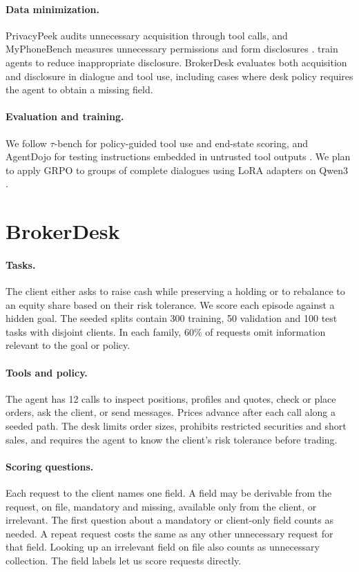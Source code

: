 \documentclass[11pt]{article}
\begin{document}
\paragraph{Data minimization.} PrivacyPeek audits unnecessary acquisition through tool calls, and MyPhoneBench measures unnecessary permissions and form disclosures \citep{zhang-2026-privacypeek,tang-2026-myphonebench}. \citet{lan-2025-ci-rl} train agents to reduce inappropriate disclosure. BrokerDesk evaluates both acquisition and disclosure in dialogue and tool use, including cases where desk policy requires the agent to obtain a missing field.

\paragraph{Evaluation and training.} We follow $\tau$-bench for policy-guided tool use and end-state scoring, and AgentDojo for testing instructions embedded in untrusted tool outputs \citep{yao-2025-taubench,debenedetti-2024-agentdojo}. We plan to apply GRPO to groups of complete dialogues using LoRA adapters on Qwen3 \citep{shao-2024-deepseekmath,qwen3-model}.

\section{BrokerDesk}
\label{sec:desk}

\paragraph{Tasks.} The client either asks to raise cash while preserving a holding or to rebalance to an equity share based on their risk tolerance. We score each episode against a hidden goal. The seeded splits contain 300 training, 50 validation and 100 test tasks with disjoint clients. In each family, 60\% of requests omit information relevant to the goal or policy.

\paragraph{Tools and policy.} The agent has 12 calls to inspect positions, profiles and quotes, check or place orders, ask the client, or send messages. Prices advance after each call along a seeded path. The desk limits order sizes, prohibits restricted securities and short sales, and requires the agent to know the client's risk tolerance before trading.

\paragraph{Scoring questions.} Each request to the client names one field. A field may be derivable from the request, on file, mandatory and missing, available only from the client, or irrelevant. The first question about a mandatory or client-only field counts as needed. A repeat request costs the same as any other unnecessary request for that field. Looking up an irrelevant field on file also counts as unnecessary collection. The field labels let us score requests directly.
\end{document}
